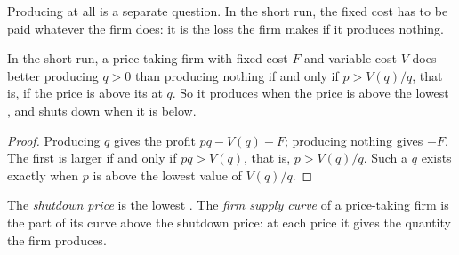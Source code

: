 Producing at all is a separate question. In the short run, the fixed cost has to be paid whatever the firm does: it is the loss the firm makes if it produces
nothing.

\begin{proposition}\label{prop:g11:perfect-competition:shutdown}
In the short run, a price-taking firm with fixed cost $F$ and variable cost $V$ does better producing $q > 0$ than producing nothing if and only if $p > V(q)/q$,
that is, if the price is above its  at $q$. So it produces when the price is above the lowest , and shuts down when it
is below.
\end{proposition}
\begin{proof}
Producing $q$ gives the profit $pq - V(q) - F$; producing nothing gives $-F$. The first is larger if and only if $pq > V(q)$, that is, $p > V(q)/q$. Such a $q$
exists exactly when $p$ is above the lowest value of $V(q)/q$.
\end{proof}

\begin{definition}\label{def:g11:perfect-competition:shutdown-price}
The \emph{shutdown price} is the lowest . The \emph{firm supply curve}%
\label{def:g11:perfect-competition:firm-supply} of a price-taking firm is the part of its  curve above the shutdown price: at each
price it gives the quantity the firm produces.
\end{definition}

